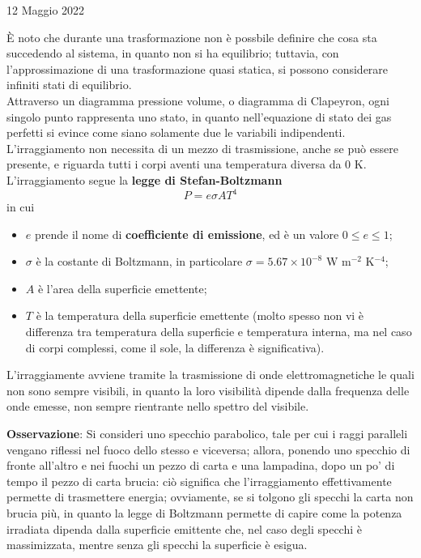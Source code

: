 \documentclass[a4paper]{extarticle}
\begin{document}
\newpage
\noindent
\begin{center}
  12 Maggio 2022
\end{center}
È noto che durante una trasformazione non è possbile definire che cosa sta succedendo al sistema, in quanto non si ha equilibrio; tuttavia, con l'approssimazione di una trasformazione quasi statica, si possono considerare infiniti stati di equilibrio.\\
Attraverso un diagramma pressione volume, o diagramma di Clapeyron, ogni singolo punto rappresenta uno stato, in quanto nell'equazione di stato dei gas perfetti si evince come siano solamente due le variabili indipendenti.\\
L'irraggiamento non necessita di un mezzo di trasmissione, anche se può essere presente, e riguarda tutti i corpi aventi una temperatura diversa da $0$ K. L'irraggiamento segue la \textbf{legge di Stefan-Boltzmann}
\[\boxed{P=e \sigma A T^4}\]
in cui
\begin{itemize}
  \item $e$ prende il nome di \textbf{coefficiente di emissione}, ed è un valore $0 \leq e \leq 1$;
  \item $\sigma$ è la costante di Boltzmann, in particolare $\sigma = 5.67 \times 10^{-8}$ W m$^{-2}$ K$^{-4}$;
  \item $A$ è l'area della superficie emettente;
  \item $T$ è la temperatura della superficie emettente (molto spesso non vi è differenza tra temperatura della superficie e temperatura interna, ma nel caso di corpi complessi, come il sole, la differenza è significativa).
\end{itemize}
L'irraggiamente avviene tramite la trasmissione di onde elettromagnetiche le quali non sono sempre visibili, in quanto la loro visibilità dipende dalla frequenza delle onde emesse, non sempre rientrante nello spettro del visibile.

\vspace{1em}
\noindent
\textbf{Osservazione}: Si consideri uno specchio parabolico, tale per cui i raggi paralleli vengano riflessi nel fuoco dello stesso e viceversa; allora, ponendo uno specchio di fronte all'altro e nei fuochi un pezzo di carta e una lampadina, dopo un po' di tempo il pezzo di carta brucia: ciò significa che l'irraggiamento effettivamente permette di trasmettere energia; ovviamente, se si tolgono gli specchi la carta non brucia più, in quanto la legge di Boltzmann permette di capire come la potenza irradiata dipenda dalla superficie emittente che, nel caso degli specchi è massimizzata, mentre senza gli specchi la superficie è esigua.
\end{document}
